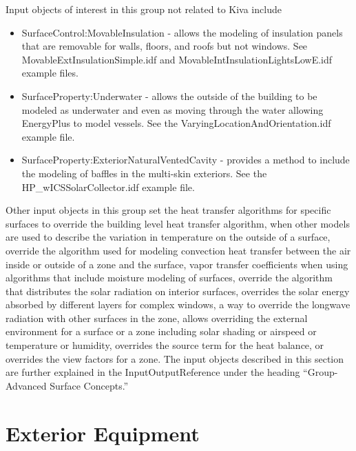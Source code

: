 Input objects of interest in this group not related to Kiva include
\begin{itemize}
\item SurfaceControl:MovableInsulation - allows the modeling of insulation
panels that are removable for walls, floors, and roofs but not windows.
See MovableExtInsulationSimple.idf and MovableIntInsulationLightsLowE.idf
example files.
\item SurfaceProperty:Underwater - allows the outside of the building to
be modeled as underwater and even as moving through the water allowing
EnergyPlus to model vessels. See the VaryingLocationAndOrientation.idf
example file.
\item SurfaceProperty:ExteriorNaturalVentedCavity - provides a method to
include the modeling of baffles in the multi-skin exteriors. See the
HP\_wICSSolarCollector.idf example file.
\end{itemize}
Other input objects in this group set the heat transfer algorithms
for specific surfaces to override the building level heat transfer
algorithm, when other models are used to describe the variation in
temperature on the outside of a surface, override the algorithm used
for modeling convection heat transfer between the air inside or outside
of a zone and the surface, vapor transfer coefficients when using
algorithms that include moisture modeling of surfaces, override the
algorithm that distributes the solar radiation on interior surfaces,
overrides the solar energy absorbed by different layers for complex
windows, a way to override the longwave radiation with other surfaces
in the zone, allows overriding the external environment for a surface
or a zone including solar shading or airspeed or temperature or humidity,
overrides the source term for the heat balance, or overrides the view
factors for a zone. The input objects described in this section are
further explained in the InputOutputReference under the heading ``Group-Advanced
Surface Concepts.''

\section{Exterior Equipment}

